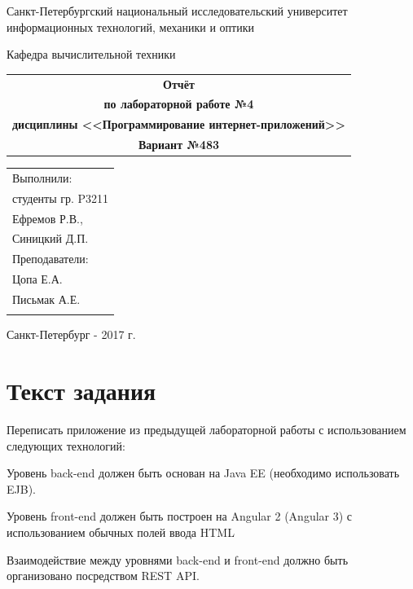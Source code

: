 \documentclass[a4paper, 12pt]{article}
\newenvironment{itemize*}%
  {\begin{itemize}%
    \setlength{\itemsep}{1pt}%
    \setlength{\parskip}{1pt}}%
  {\end{itemize}}
\begin{document}
\begin{titlepage}
\begin{center}
{Санкт-Петербургский национальный исследовательский университет информационных технологий, механики и оптики}

Кафедра вычислительной техники
\end{center}
\vspace{50mm}
\begin{center}
\begin{tabular}{c}
\Huge{\textbf{Отчёт}}\\
\Large{\textbf{по лабораторной работе №4}}\\
\Large{\textbf{дисциплины <<Программирование интернет-приложений>>}}\\
\Large{\textbf{Вариант №483}}\\[2mm]
\end{tabular}
\end{center}
\vspace{85mm}
\begin{flushright}
\begin{tabular}{l}
Выполнили:\\
студенты гр. P3211\\
Ефремов Р.В.,\\
Синицкий Д.П.\\
Преподаватели:\\
Цопа Е.А.\\
Письмак А.Е.\\
\\
\end{tabular}
\end{flushright}
\vspace{15mm}
\begin{center}
Санкт-Петербург - 2017 г.
\end{center}
\end{titlepage}
\newpage

\section{Текст задания}

Переписать приложение из предыдущей лабораторной работы с использованием следующих технологий:

\begin{itemize*}
\item Уровень back-end должен быть основан на Java EE (необходимо использовать EJB).
\item Уровень front-end должен быть построен на Angular 2 (Angular 3) с использованием обычных полей ввода HTML
\item Взаимодействие между уровнями back-end и front-end должно быть организовано посредством REST API.
\end{itemize*}
\end{document}
